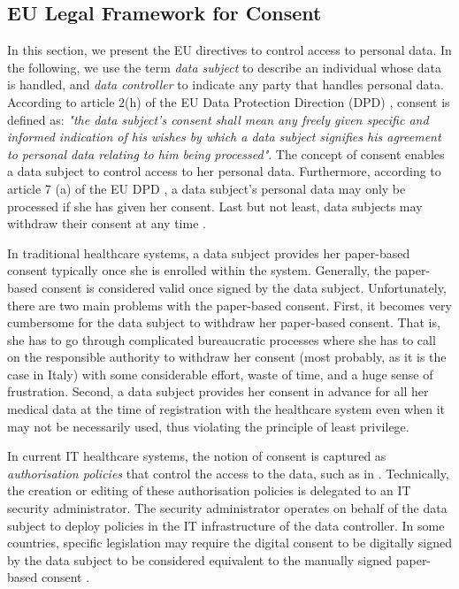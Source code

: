\documentclass[10pt, conference, compsocconf]{IEEEtran}
\begin{document}
\subsection{EU Legal Framework for Consent}
In this section, we present the EU directives to control access to personal data. In the following, we use the term \emph{data subject} to describe an individual whose data is handled, and \emph{data controller} to indicate any party that handles personal data. According to article 2(h) of the EU Data Protection Direction (DPD) \cite{EC1995}, consent is defined as: \emph{"the data subject's consent shall mean any freely given specific and informed indication of his wishes by which a data subject signifies his agreement to personal data relating to him being processed"}. The concept of consent enables a data subject to control access to her personal data. Furthermore, according to article 7 (a) of the EU DPD \cite{EC1995}, a data subject's personal data may only be processed if she has given her consent. Last but not least, data subjects may withdraw their consent at any time \cite{PDPA1999}.

In traditional healthcare systems, a data subject provides her paper-based consent typically once she is enrolled within the system. Generally, the paper-based consent is considered valid once signed by the data subject. Unfortunately, there are two main problems with the paper-based consent. First, it becomes very cumbersome for the data subject to withdraw her paper-based consent. That is, she has to go through complicated bureaucratic processes where she has to call on the responsible authority to withdraw her consent (most probably, as it is the case in Italy) with some considerable effort, waste of time, and a huge sense of frustration. Second, a data subject provides her consent in advance for all her medical data at the time of registration with the healthcare system even when it may not be necessarily used, thus violating the principle of least privilege.

In current IT healthcare systems, the notion of consent is captured as \emph{authorisation policies} that control the access to the data, such as in \cite{Russello2008}. Technically, the creation or editing of these authorisation policies is delegated to an IT security administrator. The security administrator operates on behalf of the data subject to deploy policies in the IT infrastructure of the data controller. In some countries, specific legislation may require the digital consent to be digitally signed by the data subject to be considered equivalent to the manually signed paper-based consent \cite{EC1999}.
\end{document}

